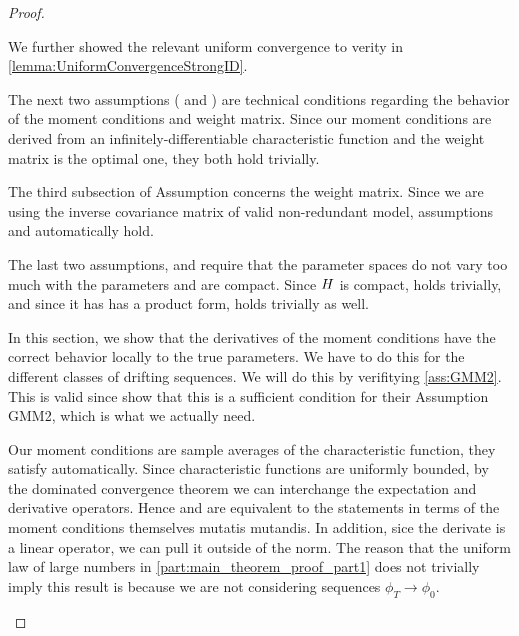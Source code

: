 \documentclass[11pt, letterpaper, twoside, final]{article}
\begin{document}
\begin{appendices}
\begin{proof}
\begin{proofpart}

    We further showed the relevant uniform convergence to verity  in
    \cref{lemma:UniformConvergenceStrongID}.
    
    The next two assumptions ( and ) are  technical conditions regarding
    the behavior of the moment conditions and weight matrix. 
    Since our moment conditions are derived from an infinitely-differentiable  characteristic function and the
    weight matrix is the optimal one, they both hold trivially.
    
    The third subsection of Assumption  concerns the weight matrix.
    Since we are using the inverse covariance matrix of valid non-redundant model, assumptions
     and  automatically hold.
    
    The last two assumptions,  and  require that the parameter spaces do
    not vary too much with the parameters and are compact.
    Since $H$ is compact,  holds trivially, and since it has  has a product form,
      holds trivially as well.
    
\end{proofpart}


\begin{proofpart}
    \label{part:mainTheoremProofPart2}

    In this section, we show that the derivatives of the moment conditions have the correct behavior locally to
    the true parameters.
    We have to do this for the different classes of drifting sequences.
    We will do this by verifitying \cref{ass:GMM2}.
    This is valid since \textcite{andrews2014Gmm} show that this is a sufficient condition for their Assumption
    GMM2, which is what we actually need. 

    Our moment conditions are sample averages of the characteristic function, they satisfy 
    automatically. 
    Since characteristic functions are uniformly bounded, by the dominated convergence theorem we can interchange the 
    expectation and derivative operators. 
    Hence  and  are equivalent to the statements in terms of the moment
    conditions themselves mutatis mutandis.  
    In addition, sice the derivate is a linear operator, we can pull it outside of the norm.
    The reason that the uniform law of large numbers in \cref{part:main_theorem_proof_part1} does not trivially
    imply this result is because we are not considering sequences $\phi_T \to \phi_0$. 



\end{proofpart}
\end{proof}
\end{appendices}
\end{document}
